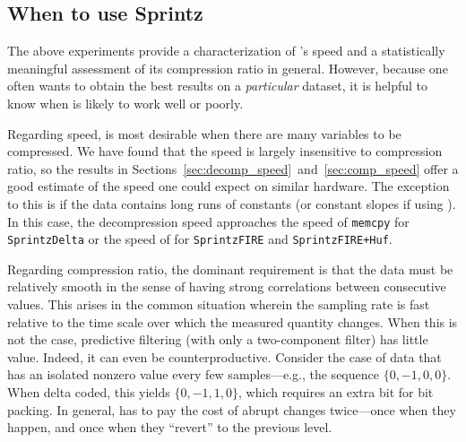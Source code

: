 \subsection{When to use Sprintz} \label{sec:whenSprintz}


The above experiments provide a characterization of \mine's speed and a statistically meaningful assessment of its compression ratio in general. However, because one often wants to obtain the best results on a \textit{particular} dataset, it is helpful to know when \minesp is likely to work well or poorly.

Regarding speed, \minesp is most desirable when there are many variables to be compressed. We have found that the speed is largely insensitive to compression ratio, so the results in Sections~\ref{sec:decomp_speed}~and~\ref{sec:comp_speed} offer a good estimate of the speed one could expect on similar hardware. The exception to this is if the data contains long runs of constants (or constant slopes if using \fire). In this case, the decompression speed approaches the speed of \texttt{memcpy} for \texttt{SprintzDelta} or the speed of \fire for \texttt{SprintzFIRE} and \texttt{SprintzFIRE+Huf}.


Regarding compression ratio, the dominant requirement is that the data must be relatively smooth in the sense of having strong correlations between consecutive values. This arises in the common situation wherein the sampling rate is fast relative to the time scale over which the measured quantity changes. When this is not the case, predictive filtering (with only a two-component filter) has little value. Indeed, it can even be counterproductive. Consider the case of data that has an isolated nonzero value every few samples---e.g., the sequence $\{0, -1, 0, 0\}$. When delta coded, this yields $\{0, -1, 1, 0\}$, which requires an extra bit for \minesp bit packing. In general, \minesp has to pay the cost of abrupt changes twice---once when they happen, and once when they ``revert'' to the previous level.

